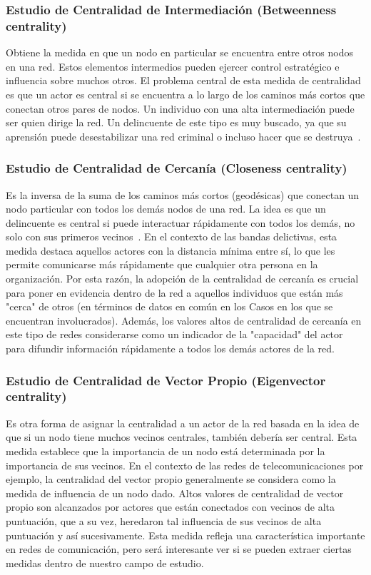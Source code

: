 
\subsubsection{Estudio de Centralidad de Intermediación (Betweenness centrality)} Obtiene la medida en que un nodo en particular se encuentra entre otros nodos en una red. Estos elementos intermedios pueden ejercer control estratégico e influencia sobre muchos otros. El problema central de esta medida de centralidad es que un actor es central si se encuentra a lo largo de los caminos más cortos que conectan otros pares de nodos. Un individuo con una alta intermediación puede ser quien dirige la red. Un delincuente de este tipo es muy buscado, ya que su aprensión puede desestabilizar una red criminal o incluso hacer que se destruya~\cite{ref_article32}.

\subsubsection{Estudio de Centralidad de Cercanía (Closeness centrality)} Es la inversa de la suma de los caminos más cortos (geodésicas) que conectan un nodo particular con todos los demás nodos de una red. La idea es que un delincuente es central si puede interactuar rápidamente con todos los demás, no solo con sus primeros vecinos~\cite{ref_article33}. En el contexto de las bandas delictivas, esta medida destaca aquellos actores con la distancia mínima entre sí, lo que les permite comunicarse más rápidamente que cualquier otra persona en la organización. Por esta razón, la adopción de la centralidad de cercanía es crucial para poner en evidencia dentro de la red a aquellos individuos que están más "cerca" de otros (en términos de datos en común en los Casos en los que se encuentran involucrados). Además, los valores altos de centralidad de cercanía en este tipo de redes considerarse como un indicador de la "capacidad" del actor para difundir información rápidamente a todos los demás actores de la red.

\subsubsection{Estudio de Centralidad de Vector Propio (Eigenvector centrality)} Es otra forma de asignar la centralidad a un actor de la red basada en la idea de que si un nodo tiene muchos vecinos centrales, también debería ser central. Esta medida establece que la importancia de un nodo está determinada por la importancia de sus vecinos. En el contexto de las redes de telecomunicaciones por ejemplo, la centralidad del vector propio generalmente se considera como la medida de influencia de un nodo dado. Altos valores de centralidad de vector propio son alcanzados por actores que están conectados con vecinos de alta puntuación, que a su vez, heredaron tal influencia de sus vecinos de alta puntuación y así sucesivamente. Esta medida refleja una característica importante en redes de comunicación, pero será interesante ver si se pueden extraer ciertas medidas dentro de nuestro campo de estudio.

